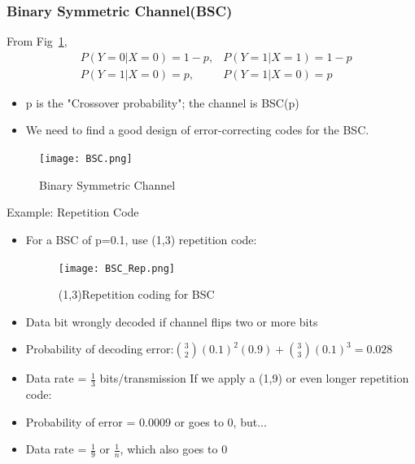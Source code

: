 \documentclass[12pt]{article}
\begin{document}
\subsubsection{Binary Symmetric Channel(BSC)}
From Fig~\ref{fig:BSC},
\begin{align*}
    &P(Y=0|X=0) = 1 - p, &P(Y=1|X=1) = 1 - p\\
    &P(Y=1|X=0) = p, &P(Y=1|X=0) = p
\end{align*}
\begin{itemize}
    \item p is the "Crossover probability"; the channel is BSC(p)
    \item We need to find a good design of error-correcting codes for the BSC.
\end{itemize}
\begin{figure}[h]
    \centering
    \texttt{[image: BSC.png]}
    \caption{Binary Symmetric Channel}
    \label{fig:BSC}
\end{figure}
Example: Repetition Code
\begin{itemize}
    \item For a BSC of p=0.1, use  (1,3) repetition code:
    \begin{figure}[h]
        \centering
        \texttt{[image: BSC\_Rep.png]}
        \caption{(1,3)Repetition coding for BSC}
        \label{fig:BSC_repti}
    \end{figure}
    \item Data bit wrongly decoded if channel flips two or more bits
    \item Probability of decoding error:$\binom 3 2 (0.1)^2(0.9) + \binom{3}{3} (0.1)^3 = 0.028$
    \item Data rate = $\frac{1}{3}$ bits/transmission
    If we apply a (1,9) or even longer repetition code:
    \item Probability of error = 0.0009 or goes to 0, but...
    \item Data rate = $\frac{1}{9} $ or $\frac{1}{n} $, which also goes to 0
\end{itemize}
\end{document}
